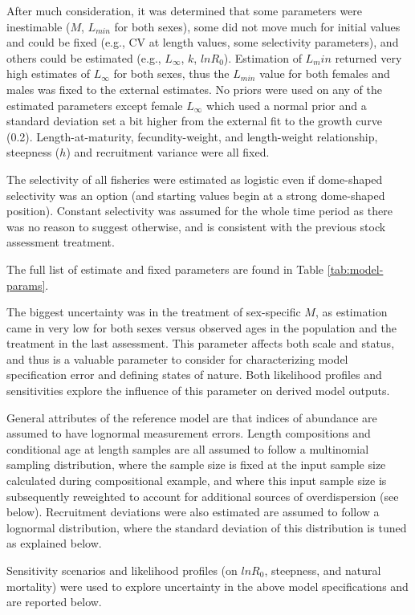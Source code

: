 \documentclass[11pt,
  english,
  letterpaper,
]{article}
\begin{document}
After much consideration, it was determined that some parameters were inestimable (\(M\), \(L_{min}\) for both sexes), some did not move much for initial values and could be fixed (e.g., CV at length values, some selectivity parameters), and others could be estimated (e.g., \(L_{\infty}\), \(k\), \(lnR_0\)). Estimation of \(L_min\) returned very high estimates of \(L_{\infty}\) for both sexes, thus the \(L_{min}\) value for both females and males was fixed to the external estimates. No priors were used on any of the estimated parameters except female \(L_{\infty}\) which used a normal prior and a standard deviation set a bit higher from the external fit to the growth curve (0.2). Length-at-maturity, fecundity-weight, and length-weight relationship, steepness (\(h\)) and recruitment variance were all fixed.

The selectivity of all fisheries were estimated as logistic even if dome-shaped selectivity was an option (and starting values begin at a strong dome-shaped position). Constant selectivity was assumed for the whole time period as there was no reason to suggest otherwise, and is consistent with the previous stock assessment treatment.

The full list of estimate and fixed parameters are found in Table \ref{tab:model-params}.

The biggest uncertainty was in the treatment of sex-specific \(M\), as estimation came in very low for both sexes versus observed ages in the population and the treatment in the last assessment. This parameter affects both scale and status, and thus is a valuable parameter to consider for characterizing model specification error and defining states of nature. Both likelihood profiles and sensitivities explore the influence of this parameter on derived model outputs.

General attributes of the reference model are that indices of abundance are assumed to have lognormal measurement errors. Length compositions and conditional age at length samples are all assumed to follow a multinomial sampling distribution, where the sample size is fixed at the input sample size calculated during compositional example, and where this input sample size is subsequently reweighted to account for additional sources of overdispersion (see below). Recruitment deviations were also estimated are assumed to follow a lognormal distribution, where the standard deviation of this distribution is tuned as explained below.

Sensitivity scenarios and likelihood profiles (on \(lnR_0\), steepness, and natural mortality) were used to explore uncertainty in the above model specifications and are reported below.
\end{document}

